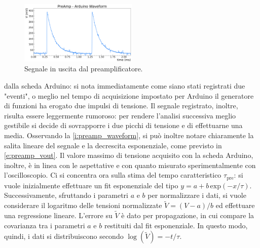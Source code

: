 \documentclass[a4paper,11pt]{article} %
\begin{document}
\begin{figure}
	\centering
	\includegraphics[width=0.5\textwidth]{../Plots/PreAmp/preamp_waveform.png}
	\vspace{-25pt}
	\caption{\small Segnale in uscita dal preamplificatore.}
	\label{i:preamp_waveform}
\end{figure}

dalla scheda Arduino: si nota immediatamente come siano stati registrati due "eventi", o meglio nel tempo di
acquisizione impostato per Arduino il generatore di funzioni ha erogato due impulsi di tensione. Il segnale registrato,
inoltre, risulta essere leggermente rumoroso: per rendere l'analisi successiva meglio gestibile si decide di sovrapporre
i due picchi di tensione e di effettuarne una media. Osservando la \autoref{i:preamp_waveform}, si può inoltre notare
chiaramente la salita lineare del segnale e la decrescita esponenziale, come previsto in \autoref{e:preamp_vout}. Il
valore massimo di tensione acquisito con la scheda Arduino, inoltre, è in linea con le aspettative e con quanto misurato
sperimentalmente con l'oscilloscopio. Ci si concentra ora sulla stima del tempo caratteristico $\tau_{\text{pre}}$: si
vuole inizialmente effettuare un fit esponenziale del tipo $y = a + b\,\text{exp}(-x/\tau)$. Successivamente, sfruttando
i parametri $a$ e $b$ per normalizzare i dati, si vuole considerare il logaritmo delle tensioni normalizzate $\tilde{V}
= (V-a)/b$ ed effettuare una regressione lineare. L'errore su $\tilde{V}$ è dato per propagazione, in cui compare la
covarianza tra i parametri $a$ e $b$ restituiti dal fit esponenziale. In questo modo, quindi, i dati si distribuiscono
secondo $\log(\tilde{V})= -t/\tau$. 
 
\end{document}
